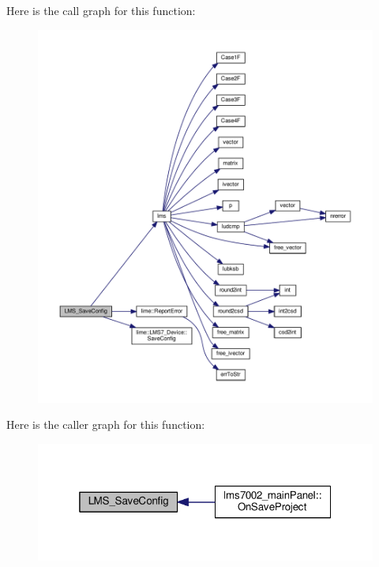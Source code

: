Here is the call graph for this function\+:
\nopagebreak
\begin{figure}[H]
\begin{center}
\leavevmode
\includegraphics[width=350pt]{df/de1/lms7__api_8cpp_a2160d093e5c947adbaddafec1e041427_cgraph}
\end{center}
\end{figure}




Here is the caller graph for this function\+:
\nopagebreak
\begin{figure}[H]
\begin{center}
\leavevmode
\includegraphics[width=319pt]{df/de1/lms7__api_8cpp_a2160d093e5c947adbaddafec1e041427_icgraph}
\end{center}
\end{figure}


